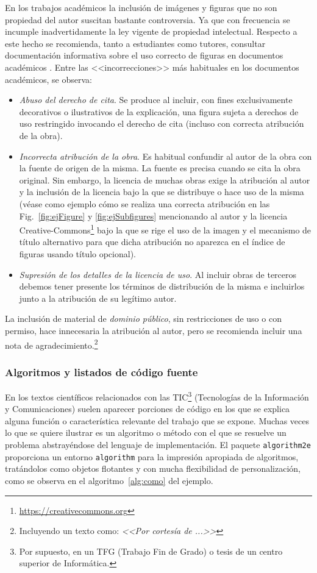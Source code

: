En los trabajos académicos la inclusión de imágenes y figuras que no son propiedad del autor suscitan bastante controversia. Ya que con frecuencia se incumple inadvertidamente la ley vigente de propiedad intelectual. Respecto a este hecho se recomienda, tanto a estudiantes como tutores, consultar documentación informativa sobre el uso correcto de figuras en documentos académicos \cite{uclm20,unican18}. Entre las <<incorrecciones>> más habituales en los documentos académicos, se observa:
\begin{itemize}
\item \emph{Abuso del derecho de cita}. Se produce al incluir, con fines exclusivamente decorativos o ilustrativos de la explicación, una figura sujeta a derechos de uso restringido invocando el derecho de cita (incluso con correcta atribución de la obra).

\item \emph{Incorrecta atribución de la obra}. Es habitual confundir al autor de la obra con la fuente de origen de la misma. La fuente es precisa cuando se cita la obra original. Sin embargo, la licencia de muchas obras exige la atribución al autor y la inclusión de la licencia bajo la que se distribuye o hace uso de la misma (véase como ejemplo cómo se realiza una correcta atribución en las Fig.~\ref{fig:ejFigure} y \ref{fig:ejSubfigures} mencionando al autor y la licencia Creative-Commons\footnote{\url{https://creativecommons.org}} bajo la que se rige el uso de la imagen y el mecanismo de título alternativo para que dicha atribución no aparezca en el índice de figuras usando título opcional).

\item \emph{Supresión de los detalles de la licencia de uso}. Al incluir obras de terceros debemos tener presente los términos de distribución de la misma e incluirlos junto a la atribución de su legítimo autor.
\end{itemize}

La inclusión de material de \emph{dominio público}, sin restricciones de uso o con permiso, hace innecesaria la atribución al autor, pero se recomienda incluir una nota de agradecimiento.\footnote{Incluyendo un texto como: \emph{<<Por cortesía de ...>>}}



\subsubsection{Algoritmos y listados de código fuente}
En los textos científicos relacionados con las 
TIC\footnote{Por supuesto, en un TFG (Trabajo Fin de Grado) o tesis 
de un centro superior de Informática.} (Tecnologías de la Información y 
Comunicaciones) suelen aparecer porciones de código en los que se explica 
alguna función o característica relevante del trabajo que se expone. Muchas 
veces lo que se quiere ilustrar es un algoritmo o método con el que se resuelve un problema abstrayéndose del lenguaje de implementación. El paquete \texttt{algorithm2e} proporciona un entorno \texttt{algorithm} para la impresión apropiada de algoritmos, tratándolos como objetos flotantes y con mucha flexibilidad de personalización, como se observa en el algoritmo~\ref{alg:como} del ejemplo.


